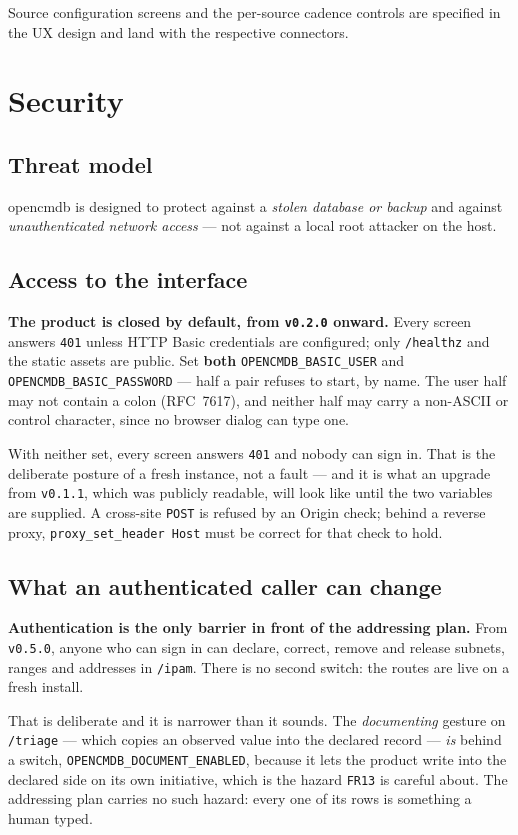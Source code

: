 \documentclass[11pt,oneside,listof=totoc,bibliography=totoc]{scrreprt}
\begin{document}
\begin{planned}
Source configuration screens and the per-source cadence controls are specified in the UX
design and land with the respective connectors.
\end{planned}

\chapter{Security}
\section{Threat model}
opencmdb is designed to protect against a \emph{stolen database or backup} and against
\emph{unauthenticated network access} — not against a local root attacker on the host.

\section{Access to the interface}
\textbf{The product is closed by default, from \texttt{v0.2.0} onward.} Every screen
answers \texttt{401} unless HTTP Basic credentials are configured; only \texttt{/healthz} and
the static assets are public. Set \textbf{both} \texttt{OPENCMDB\_BASIC\_USER} and
\texttt{OPENCMDB\_BASIC\_PASSWORD} --- half a pair refuses to start, by name. The user half
may not contain a colon (RFC~7617), and neither half may carry a non-ASCII or control
character, since no browser dialog can type one.

With neither set, every screen answers \texttt{401} and nobody can sign in. That is the
deliberate posture of a fresh instance, not a fault --- and it is what an upgrade from
\texttt{v0.1.1}, which was publicly readable, will look like until the two variables are
supplied. A cross-site \texttt{POST} is refused by an Origin check; behind a reverse proxy,
\texttt{proxy\_set\_header Host} must be correct for that check to hold.

\section{What an authenticated caller can change}
\textbf{Authentication is the only barrier in front of the addressing plan.} From
\texttt{v0.5.0}, anyone who can sign in can declare, correct, remove and release subnets,
ranges and addresses in \texttt{/ipam}. There is no second switch: the routes are live on a
fresh install.

That is deliberate and it is narrower than it sounds. The \emph{documenting} gesture on
\texttt{/triage} --- which copies an observed value into the declared record --- \emph{is}
behind a switch, \texttt{OPENCMDB\_DOCUMENT\_ENABLED}, because it lets the product write into
the declared side on its own initiative, which is the hazard \texttt{FR13} is careful about.
The addressing plan carries no such hazard: every one of its rows is something a human typed.
\end{document}
